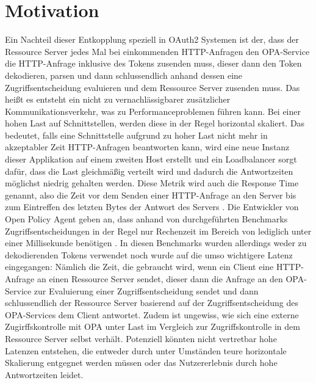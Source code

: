 \section{Motivation}
\label{sec:intro:motivation}
Ein Nachteil dieser Entkopplung speziell in OAuth2 Systemen ist der, dass der Ressource Server jedes Mal bei einkommenden HTTP-Anfragen den OPA-Service die HTTP-Anfrage inklusive des Tokens zusenden muss, dieser dann den Token dekodieren, parsen und dann schlussendlich anhand dessen eine Zugriffsentscheidung evaluieren und dem Ressource Server zusenden muss. Das heißt es entsteht ein nicht zu vernachlässigbarer zusätzlicher Kommunikationsverkehr, was zu Performanceproblemen führen kann. Bei einer hohen Last auf Schnittstellen, werden diese in der Regel horizontal skaliert. Das bedeutet, falls eine Schnittstelle aufgrund zu hoher Last nicht mehr in akzeptabler Zeit HTTP-Anfragen beantworten kann, wird eine neue Instanz dieser Applikation auf einem zweiten Host erstellt und ein Loadbalancer sorgt dafür, dass die Last gleichmäßig verteilt wird und dadurch die Antwortzeiten möglichst niedrig gehalten werden. Diese Metrik wird auch die Response Time genannt, also die Zeit vor dem Senden einer HTTP-Anfrage an den Server bis zum Eintreffen des letzten Bytes der Antwort des Servers \citep{jmeterglossary:2021}. 
Die Entwickler von Open Policy Agent geben an, dass anhand von durchgeführten Benchmarks Zugriffsentscheidungen in der Regel nur Rechenzeit im Bereich von lediglich unter einer Millisekunde benötigen \citep{opaperformance:2021:07}. In diesen Benchmarks wurden allerdings weder zu dekodierenden Tokens verwendet noch wurde auf die umso wichtigere Latenz eingegangen: Nämlich die Zeit, die gebraucht wird, wenn ein Client eine HTTP-Anfrage an einen Ressource Server sendet, dieser dann die Anfrage an den OPA-Service zur Evaluierung einer Zugriffsentscheidung sendet und dann schlussendlich der Ressource Server basierend auf der Zugriffsentscheidung des OPA-Services dem Client antwortet. Zudem ist ungewiss, wie sich eine externe Zugirffskontrolle mit OPA unter Last im Vergleich zur Zugriffskontrolle in dem Ressource Server selbst verhält. Potenziell könnten nicht vertretbar hohe Latenzen entstehen, die entweder durch unter Umständen teure horizontale Skalierung entgegnet werden müssen oder das Nutzererlebnis durch hohe Antwortzeiten leidet.

%
%
